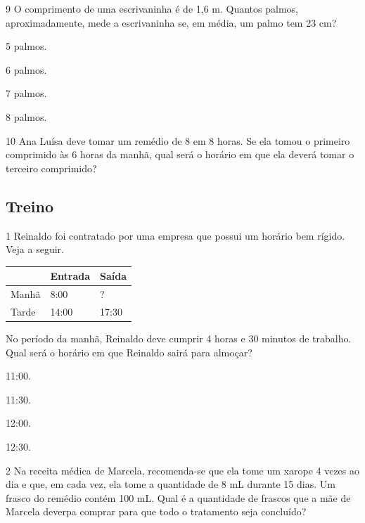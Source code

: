 \begin{mdframed}[linewidth=2pt,linecolor=salmao,roundcorner=2pt]
\num{9} O comprimento de uma escrivaninha é de 1,6 m. Quantos palmos,
aproximadamente, mede a escrivaninha se, em média, um palmo tem 23 cm?

\begin{escolha}
\item
  5 palmos.
\item
  6 palmos.
\item
  7 palmos.
\item
  8 palmos.
\end{escolha}


\num{10} Ana Luísa deve tomar um remédio de 8 em 8 horas. Se ela tomou o primeiro
comprimido às 6 horas da manhã, qual será o horário em que ela deverá tomar
o terceiro comprimido?

\begin{mdframed}[linewidth=2pt,linecolor=salmao,roundcorner=2pt]


\end{mdframed}


\subsection{Treino}

\num{1} Reinaldo foi contratado por uma empresa que possui um horário bem rígido.
Veja a seguir.

\begin{longtable}[]{@{}lll@{}}
\toprule
& Entrada & Saída\tabularnewline
\midrule
\endhead
Manhã & 8:00 & ?\tabularnewline
Tarde & 14:00 & 17:30\tabularnewline
\bottomrule
\end{longtable}


No período da manhã, Reinaldo deve
cumprir 4 horas e 30 minutos de trabalho. Qual será o horário em que
Reinaldo sairá para almoçar?

\begin{escolha}
\item
  11:00.
\item
  11:30.
\item
  12:00.
\item
  12:30.
\end{escolha}

\num{2} Na receita médica de Marcela, recomenda-se que ela tome um xarope 4 vezes ao
dia e que, em cada vez, ela tome a quantidade de 8 mL durante 15 dias. Um
frasco do remédio contém 100 mL. Qual é a quantidade de
frascos que a mãe de Marcela deverpa comprar para que todo o tratamento
seja concluído?


\end{mdframed}
